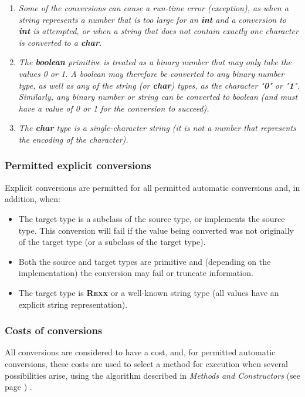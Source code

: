 \begin{enumerate}
\item \emph{Some of the conversions can cause a run-time error (exception), as
when a string represents a number that is too large for an \textbf{int}
and a conversion to \textbf{int} is attempted, or when a string that
does not contain exactly one character is converted to a
\textbf{char}.}
\item 
\emph{The \textbf{boolean} primitive is treated as a binary number that may
only take the values 0 or 1.
A boolean may therefore be converted to
any binary number type, as well as any of the string
(or \textbf{char}) types, as the character "\textbf{0}" or
"\textbf{1}".
Similarly, any binary number or string can be converted to boolean (and
must have a value of 0 or 1 for the conversion to succeed).}
\item 
\emph{The \textbf{char} type is a single-character string (it is not a
number that represents the encoding of the character).}
\end{enumerate}
\subsubsection{Permitted explicit conversions}
 
Explicit conversions are permitted for all permitted automatic
conversions and, in addition, when:
\begin{itemize}
\item 
The target type is a subclass of the source type, or implements
the source type.
This conversion will fail if the value being converted was not
originally of the target type (or a subclass of the target type).
\item 
Both the source and target types are primitive and (depending on the
implementation) the conversion may fail or truncate information.
\item 
The target type is \textbf{R\textsc{exx}} or a well-known string type (all
values have an explicit string representation).
\end{itemize}
\subsubsection{Costs of conversions}\label{refcosts}
 
All conversions are considered to have a cost, and, for permitted
automatic conversions, these costs are used to select a method for
execution when several possibilities arise, using the algorithm
described in  \emph{Methods and Constructors} (see page \pageref{refsmeth}) .
 
